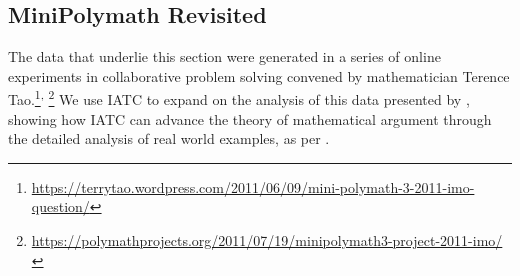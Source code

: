 \documentclass[smallextended,oneside]{svjour3}       %
\newcommand\nothing[1]{#1}
\let\thesis\nothing
\begin{document}


\subsection{MiniPolymath Revisited}\label{iatc-examples:minipolymath}

The data that underlie this section were generated in a series of online experiments in collaborative problem solving convened by mathematician Terence Tao.\footnote{\url{https://terrytao.wordpress.com/2011/06/09/mini-polymath-3-2011-imo-question/}}\textsuperscript{,}%
\footnote{\url{https://polymathprojects.org/2011/07/19/minipolymath3-project-2011-imo/}}
\thesis{We use IATC to expand on the analysis of
  this data presented by \citet{pease-and-martin},} showing how IATC can
advance the theory of mathematical argument through the
detailed analysis of real world examples, as per \citet{Carrascal2015}.
\end{document}
